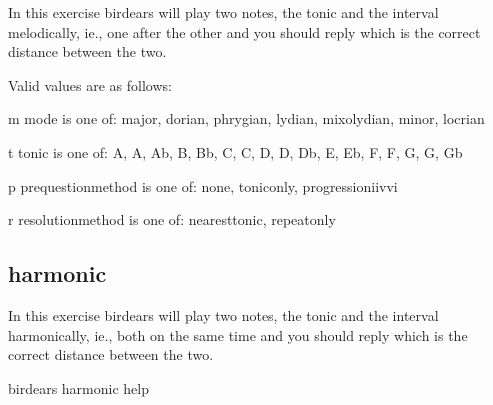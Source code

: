 \documentclass[letterpaper,10pt,english]{sphinxmanual}
\begin{document}
\begin{sphinxVerbatim}[commandchars=\\\{\}]
  In this exercise birdears will play two notes, the tonic and the interval
  melodically, ie., one after the other and you should reply which is the
  correct distance between the two.

  Valid values are as follows:

  \PYGZhy{}m \PYGZlt{}mode\PYGZgt{} is one of: major, dorian, phrygian, lydian, mixolydian, minor,
  locrian

  \PYGZhy{}t \PYGZlt{}tonic\PYGZgt{} is one of: A, A\PYGZsh{}, Ab, B, Bb, C, C\PYGZsh{}, D, D\PYGZsh{}, Db, E, Eb, F, F\PYGZsh{}, G,
  G\PYGZsh{}, Gb

  \PYGZhy{}p \PYGZlt{}prequestion\PYGZus{}method\PYGZgt{} is one of: none, tonic\PYGZus{}only, progression\PYGZus{}i\PYGZus{}iv\PYGZus{}v\PYGZus{}i

  \PYGZhy{}r \PYGZlt{}resolution\PYGZus{}method\PYGZgt{} is one of: nearest\PYGZus{}tonic, repeat\PYGZus{}only
\end{sphinxVerbatim}


\subsection{harmonic}
\label{\detokenize{index:harmonic}}
In this exercise birdears will play two notes, the tonic and the interval
harmonically, ie., both on the same time and you should reply which is the
correct distance between the two.

%
\begin{sphinxVerbatim}[commandchars=\\\{\}]
birdears harmonic \PYGZhy{}\PYGZhy{}help
\end{sphinxVerbatim}
\end{document}
